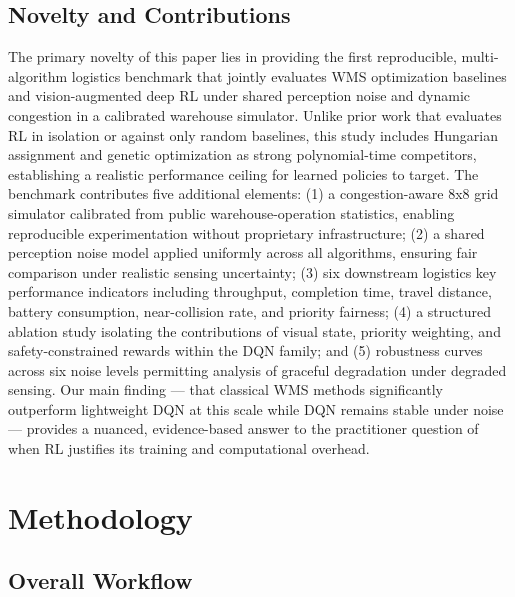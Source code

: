 \documentclass[conference]{IEEEtran}
\begin{document}
\subsection{Novelty and Contributions}

The primary novelty of this paper lies in providing the first reproducible, multi-algorithm logistics benchmark that jointly evaluates WMS optimization baselines and vision-augmented deep RL under shared perception noise and dynamic congestion in a calibrated warehouse simulator.
Unlike prior work that evaluates RL in isolation or against only random baselines, this study includes Hungarian assignment and genetic optimization as strong polynomial-time competitors, establishing a realistic performance ceiling for learned policies to target.
The benchmark contributes five additional elements: (1) a congestion-aware 8x8 grid simulator calibrated from public warehouse-operation statistics, enabling reproducible experimentation without proprietary infrastructure; (2) a shared perception noise model applied uniformly across all algorithms, ensuring fair comparison under realistic sensing uncertainty; (3) six downstream logistics key performance indicators including throughput, completion time, travel distance, battery consumption, near-collision rate, and priority fairness; (4) a structured ablation study isolating the contributions of visual state, priority weighting, and safety-constrained rewards within the DQN family; and (5) robustness curves across six noise levels permitting analysis of graceful degradation under degraded sensing.
Our main finding --- that classical WMS methods significantly outperform lightweight DQN at this scale while DQN remains stable under noise --- provides a nuanced, evidence-based answer to the practitioner question of when RL justifies its training and computational overhead.


\section{Methodology}
\label{sec:methodology}

\subsection{Overall Workflow}
\end{document}
